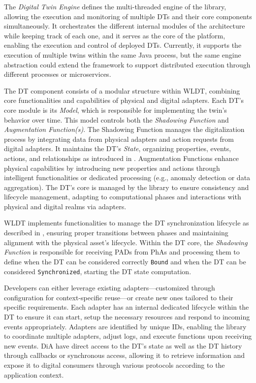 The \textit{Digital Twin Engine} defines the multi-threaded engine of the library, allowing the execution and monitoring of multiple \acp{DT} and their core components simultaneously.
It orchestrates the different internal modules of the architecture while keeping track of each one, and it serves as the core of the platform, enabling the execution and control of deployed \acp{DT}.
Currently, it supports the execution of multiple twins within the same Java process, but the same engine abstraction could extend the framework to support distributed execution through different processes or microservices.

The DT component consists of a modular structure within \ac{WLDT}, combining core functionalities and capabilities of physical and digital adapters.
%
Each DT's core module is its \textit{Model}, which is responsible for implementing the twin's behavior over time. This model controls both the \textit{Shadowing Function} and \textit{Augmentation Function(s)}.
%
The Shadowing Function manages the digitalization process by integrating data from physical adapters and action requests from digital adapters.
It maintains the DT's \textit{State}, organizing properties, events, actions, and relationships as introduced in .
%
Augmentation Functions enhance physical capabilities by introducing new properties and actions through intelligent functionalities or dedicated processing (e.g., anomaly detection or data aggregation).
The DT's core is managed by the library to ensure consistency and lifecycle management, adapting to computational phases and interactions with physical and digital realms via adapters. 

\ac{WLDT} implements functionalities to manage the \ac{DT} synchronization lifecycle as described in , ensuring proper transitions between phases and maintaining alignment with the physical asset's lifecycle.
%
Within the \ac{DT} core, the \emph{Shadowing Function} is responsible for receiving \acp{PAD} from \acp{PhA} and processing them to define when the \ac{DT} can be considered correctly \texttt{Bound} and when the \ac{DT} can be considered \texttt{Synchronized}, starting the \ac{DT} state computation. 

Developers can either leverage existing adapters---customized through configuration for context-specific reuse---or create new ones tailored to their specific requirements.
Each adapter has an internal dedicated lifecycle within the DT to ensure it can start, setup the necessary resources and respond to incoming events appropriately.
%
Adapters are identified by unique IDs, enabling the library to coordinate multiple adapters, adjust logs, and execute functions upon receiving new events. 
%
\ac{DiA} have direct access to the \ac{DT}'s state as well as the \ac{DT} history through callbacks or synchronous access, allowing it to retrieve information and expose it to digital consumers through various protocols according to the application context.


